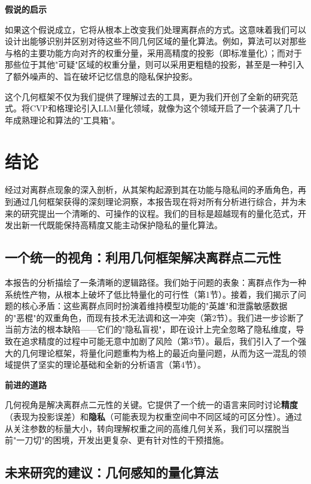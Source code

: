 \documentclass[letterpaper,twocolumn,10pt]{article}
\begin{document}
\textbf{假说的启示}

如果这个假说成立，它将从根本上改变我们处理离群点的方式。这意味着我们可以设计出能够识别并区别对待这些不同几何区域的量化算法。例如，算法可以对那些与格的主要功能方向对齐的权重分量，采用高精度的投影（即标准量化）；而对于那些位于其他"可疑"区域的权重分量，则可以采用更粗糙的投影，甚至是一种引入了额外噪声的、旨在破坏记忆信息的隐私保护投影。

这个几何框架不仅为我们提供了理解过去的工具，更为我们开创了全新的研究范式。将CVP和格理论引入LLM量化领域，就像为这个领域开启了一个装满了几十年成熟理论和算法的"工具箱"。

\section{结论}

经过对离群点现象的深入剖析，从其架构起源到其在功能与隐私间的矛盾角色，再到通过几何框架获得的深刻理论洞察，本报告现在将对所有分析进行综合，并为未来的研究提出一个清晰的、可操作的议程。我们的目标是超越现有的量化范式，开发出新一代既能保持高精度又能主动保护隐私的量化算法。

\subsection{一个统一的视角：利用几何框架解决离群点二元性}

本报告的分析描绘了一条清晰的逻辑路径。我们始于问题的表象：离群点作为一种系统性产物，从根本上破坏了低比特量化的可行性（第1节）。接着，我们揭示了问题的核心矛盾：这些离群点同时扮演着维持模型功能的"英雄"和泄露敏感数据的"恶棍"的双重角色，而现有技术无法调和这一冲突（第2节）。我们进一步诊断了当前方法的根本缺陷——它们的"隐私盲视"，即在设计上完全忽略了隐私维度，导致在追求精度的过程中可能无意中加剧了风险（第3节）。最后，我们引入了一个强大的几何理论框架，将量化问题重构为格上的最近向量问题，从而为这一混乱的领域提供了坚实的理论基础和全新的分析语言（第4节）。

\textbf{前进的道路}

几何视角是解决离群点二元性的关键。它提供了一个统一的语言来同时讨论\textbf{精度}（表现为投影误差）和\textbf{隐私}（可能表现为权重空间中不同区域的可区分性）。通过从关注参数的标量大小，转向理解权重之间的高维几何关系，我们可以摆脱当前"一刀切"的困境，开发出更复杂、更有针对性的干预措施。

\subsection{未来研究的建议：几何感知的量化算法}
\end{document}
